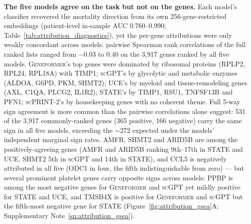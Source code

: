 \documentclass[11pt,a4paper]{article}
\newcommand{\model}[1]{\textsc{#1}}
\begin{document}
\textbf{The five models agree on the task but not on the genes.} Each
model's classifier recovered the mortality direction from its own
256-gene-restricted embeddings (patient-level in-sample AUC 0.760--0.990;
Table~\ref{tab:attribution_diagnostics}), yet the per-gene attributions were
only weakly concordant across models: pairwise Spearman rank correlations of
the full ranked lists ranged from $-0.03$ to $0.40$ on the 3{,}917 genes
ranked by all five models. \model{Geneformer}'s top genes were dominated by
ribosomal proteins (RPLP2, RPL24, RPL18A) with TIMP1; \model{scGPT}'s by
glycolytic and metabolic enzymes (ALDOA, G6PD, PKM, SHMT2); \model{UCE}'s by
myeloid and tissue-remodeling genes (AXL, C1QA, PLCG2, IL1R2);
\model{STATE}'s by TIMP1, RSU1, TNFSF13B and PFN1; \model{scPRINT-2}'s by
housekeeping genes with no coherent theme. Full 5-way sign agreement is more
common than the pairwise correlations alone suggest: 531 of the 3{,}917
commonly-ranked genes (365 positive, 166 negative) carry the same sign in
all five models, exceeding the $\sim$272 expected under the models'
independent marginal sign rates. AMFR, SHMT2 and ARID5B are among the
positively-agreeing genes (AMFR and ARID5B ranking 9th--17th in
\model{STATE} and \model{UCE}, SHMT2 5th in \model{scGPT} and 14th in
\model{STATE}), and CCL5 is negatively attributed in all five (ODC1 in
four, the fifth indistinguishable from zero) --- but several prominent
platelet genes carry opposite signs across models: PPBP is among the most
negative genes for \model{Geneformer} and \model{scGPT} yet mildly positive
for \model{STATE} and \model{UCE}, and TMSB4X is positive for
\model{Geneformer} and \model{scGPT} but the fifth-most negative gene for
\model{STATE} (Figure~\ref{fig:attribution_gsea}A;
Supplementary Note~\ref{sn:attribution_gsea}).
\end{document}
